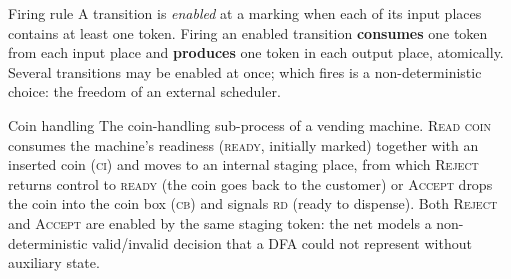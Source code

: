 \begin{definitionbox}{Firing rule}
A transition is \emph{enabled} at a marking when each of its input places contains at least one token. Firing an enabled transition \textbf{consumes} one token from each input place and \textbf{produces} one token in each output place, atomically. Several transitions may be enabled at once; which fires is a non-deterministic choice: the freedom of an external scheduler.
\end{definitionbox}

\begin{examplebox}{Coin handling}
The coin-handling sub-process of a vending machine. \textsc{Read coin} consumes the machine's readiness (\textsc{ready}, initially marked) together with an inserted coin (\textsc{ci}) and moves to an internal staging place, from which \textsc{Reject} returns control to \textsc{ready} (the coin goes back to the customer) or \textsc{Accept} drops the coin into the coin box (\textsc{cb}) and signals \textsc{rd} (ready to dispense). Both \textsc{Reject} and \textsc{Accept} are enabled by the same staging token: the net models a non-deterministic valid/invalid decision that a DFA could not represent without auxiliary state.
\begin{center}
\end{center}
\end{examplebox}

